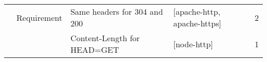 \begin{tabular}{llllr}
         & Requirement & Same headers for 304 and 200 &                                                                                                                                                                                                             [apache-http, apache-https] &        2 \\
         &             & Content-Length for HEAD=GET &                                                                                                                                                                                                                             [node-http] &        1 \\
\bottomrule
\end{tabular}
